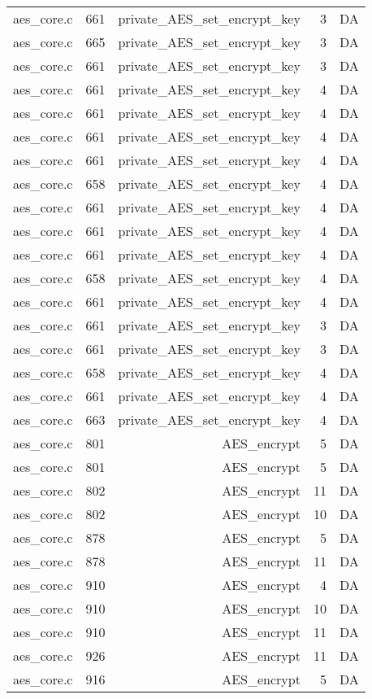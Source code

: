 \begin{table}
\begin{tabular}{clrrr}
aes\_core.c& 661&private\_AES\_set\_encrypt\_key&3 &DA\\
aes\_core.c& 665&private\_AES\_set\_encrypt\_key&3 &DA\\
aes\_core.c& 661&private\_AES\_set\_encrypt\_key&3 &DA\\
aes\_core.c& 661&private\_AES\_set\_encrypt\_key&4 &DA\\
aes\_core.c& 661&private\_AES\_set\_encrypt\_key&4 &DA\\
aes\_core.c& 661&private\_AES\_set\_encrypt\_key&4 &DA\\
aes\_core.c& 661&private\_AES\_set\_encrypt\_key&4 &DA\\
aes\_core.c& 658&private\_AES\_set\_encrypt\_key&4 &DA\\
aes\_core.c& 661&private\_AES\_set\_encrypt\_key&4 &DA\\
aes\_core.c& 661&private\_AES\_set\_encrypt\_key&4 &DA\\
aes\_core.c& 661&private\_AES\_set\_encrypt\_key&4 &DA\\
aes\_core.c& 658&private\_AES\_set\_encrypt\_key&4 &DA\\
aes\_core.c& 661&private\_AES\_set\_encrypt\_key&4 &DA\\
aes\_core.c& 661&private\_AES\_set\_encrypt\_key&3 &DA\\
aes\_core.c& 661&private\_AES\_set\_encrypt\_key&3 &DA\\
aes\_core.c& 658&private\_AES\_set\_encrypt\_key&4 &DA\\
aes\_core.c& 661&private\_AES\_set\_encrypt\_key&4 &DA\\
aes\_core.c& 663&private\_AES\_set\_encrypt\_key&4 &DA\\
aes\_core.c& 801&AES\_encrypt&5 &DA\\
aes\_core.c& 801&AES\_encrypt&5 &DA\\
aes\_core.c& 802&AES\_encrypt&11&DA\\
aes\_core.c& 802&AES\_encrypt&10&DA\\
aes\_core.c& 878&AES\_encrypt&5 &DA\\
aes\_core.c& 878&AES\_encrypt&11&DA\\
aes\_core.c& 910&AES\_encrypt&4 &DA\\
aes\_core.c& 910&AES\_encrypt&10&DA\\
aes\_core.c& 910&AES\_encrypt&11&DA\\
aes\_core.c& 926&AES\_encrypt&11&DA\\
aes\_core.c& 916&AES\_encrypt&5 &DA\\

\end{tabular}
\end{table}
